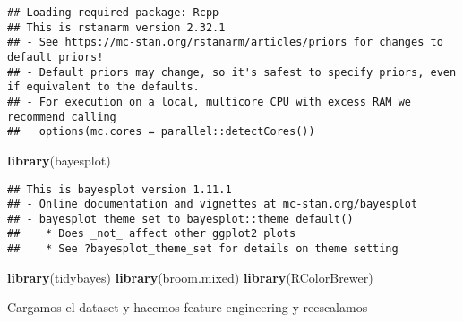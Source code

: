 \documentclass[
]{article}
\newenvironment{Shaded}{\begin{snugshade}}{\end{snugshade}}
\newcommand{\AttributeTok}[1]{\textcolor[rgb]{0.13,0.29,0.53}{#1}}
\newcommand{\CommentTok}[1]{\textcolor[rgb]{0.56,0.35,0.01}{\textit{#1}}}
\newcommand{\ConstantTok}[1]{\textcolor[rgb]{0.56,0.35,0.01}{#1}}
\newcommand{\DecValTok}[1]{\textcolor[rgb]{0.00,0.00,0.81}{#1}}
\newcommand{\FunctionTok}[1]{\textcolor[rgb]{0.13,0.29,0.53}{\textbf{#1}}}
\newcommand{\NormalTok}[1]{#1}
\newcommand{\OtherTok}[1]{\textcolor[rgb]{0.56,0.35,0.01}{#1}}
\newcommand{\SpecialCharTok}[1]{\textcolor[rgb]{0.81,0.36,0.00}{\textbf{#1}}}
\newcommand{\StringTok}[1]{\textcolor[rgb]{0.31,0.60,0.02}{#1}}
\begin{document}
\begin{verbatim}
## Loading required package: Rcpp
## This is rstanarm version 2.32.1
## - See https://mc-stan.org/rstanarm/articles/priors for changes to default priors!
## - Default priors may change, so it's safest to specify priors, even if equivalent to the defaults.
## - For execution on a local, multicore CPU with excess RAM we recommend calling
##   options(mc.cores = parallel::detectCores())
\end{verbatim}

\begin{Shaded}
\begin{Highlighting}[]
\FunctionTok{library}\NormalTok{(bayesplot)}
\end{Highlighting}
\end{Shaded}

\begin{verbatim}
## This is bayesplot version 1.11.1
## - Online documentation and vignettes at mc-stan.org/bayesplot
## - bayesplot theme set to bayesplot::theme_default()
##    * Does _not_ affect other ggplot2 plots
##    * See ?bayesplot_theme_set for details on theme setting
\end{verbatim}

\begin{Shaded}
\begin{Highlighting}[]
\FunctionTok{library}\NormalTok{(tidybayes)}
\FunctionTok{library}\NormalTok{(broom.mixed)}
\FunctionTok{library}\NormalTok{(RColorBrewer)}
\end{Highlighting}
\end{Shaded}

Cargamos el dataset y hacemos feature engineering y reescalamos

\begin{Shaded}
\end{Shaded}
\end{document}
